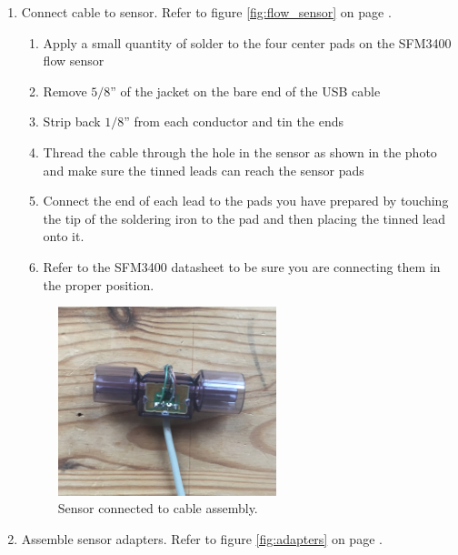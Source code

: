\documentclass[11pt, letterpaper]{article}
\begin{document}
\begin{enumerate}
\begin{enumerate}[label=4.\arabic*]
\item
Connect cable to sensor.  Refer to figure \ref{fig:flow_sensor} on page \pageref{fig:flow_sensor}.

\begin{enumerate}[label=4.2.\arabic*]
\item
Apply a small quantity of solder to the four center pads on the SFM3400 flow sensor
\item
Remove $5/8$'' of the jacket on the bare end of the USB cable
\item
Strip back $1/8$'' from each conductor and tin the ends
\item
Thread the cable through the hole in the sensor as shown in the photo and make sure the tinned leads can reach the sensor pads
\item
Connect the end of each lead to the pads you have prepared by touching the tip of the soldering iron to the pad and then placing the tinned lead onto it.
\item
Refer to the SFM3400 datasheet to be sure you are connecting them in the proper position.
\end{enumerate}
\begin{figure}[H]
\centering
\includegraphics[width=0.6\textwidth]{images/flow_cable.JPG} 
\caption{Sensor connected to cable assembly.} 
\label{fig:flow_sesor}
\end{figure}

\item
Assemble sensor adapters. Refer to figure \ref{fig:adapters} on page \pageref{fig:adapters}.


\end{enumerate}
\end{enumerate}
\end{document}
